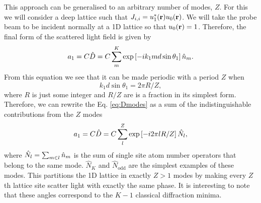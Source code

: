 This approach can be generalised to an arbitrary number of modes,
$Z$. For this we will consider a deep lattice such that
$J_{i,i} = u_1^* (\mathbf{r}) u_0 (\mathbf{r})$. We will take the probe beam to
be incident normally at a 1D lattice so that $u_0 (\mathbf{r}) =
1$. Therefore, the final form of the scattered light field is given by
\begin{equation}
  \label{eq:Dmodes}
  a_1 = C \hat{D} = C \sum_m^K \exp\left[-i k_1 m d \sin \theta_1
  \right] \hat{n}_m.
\end{equation}
From this equation we see that it can be made periodic with a period
$Z$ when
\begin{equation}
  k_1 d \sin \theta_1 = 2\pi R / Z,
\end{equation}
where $R$ is just some integer and $R/Z$ are is a fraction in its
simplest form. Therefore, we can rewrite the Eq. \eqref{eq:Dmodes} as
a sum of the indistinguishable contributions from the $Z$ modes
\begin{equation}
  \label{eq:Zmodes}
  a_1 = C \hat{D} = C \sum_l^Z \exp\left[-i 2 \pi l R / Z \right] \hat{N}_l,
\end{equation}
where $\hat{N}_l = \sum_{m \in l} \hat{n}_m$ is the sum of single site atom
number operators that belong to the same mode. $\hat{N}_K$ and
$\hat{N}_\mathrm{odd}$ are the simplest examples of these modes. This
partitions the 1D lattice in exactly $Z > 1$ modes by making every
$Z$th lattice site scatter light with exactly the same phase. It is
interesting to note that these angles correspond to the $K-1$
classical diffraction minima.

